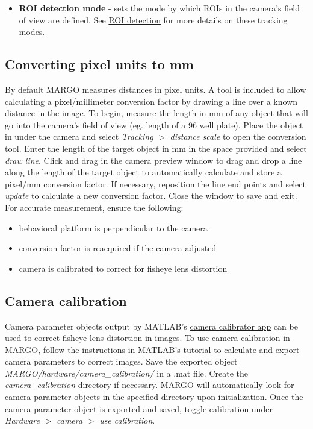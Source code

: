 \documentclass[11pt]{article}
\begin{document}
\begin{itemize}
	\item \textbf{ROI detection mode} - sets the mode by which ROIs in the camera's field of view are defined. See \hyperlink{roidetect}{ROI detection} for more details on these tracking modes.
\end{itemize}

\subsection{Converting pixel units to mm}

By default MARGO measures distances in pixel units. A tool is included to allow calculating a pixel/millimeter conversion factor by drawing a line over a known distance in the image. To begin, measure the length in mm of any object that will go into the camera's field of view (eg. length of a 96 well plate). Place the object in under the camera and select \textit{Tracking} $>$ \textit{distance scale} to open the conversion tool. Enter the length of the target object in mm in the space provided and select \textit{draw line}. Click and drag in the camera preview window to drag and drop a line along the length of the target object to automatically calculate and store a pixel/mm conversion factor. If necessary, reposition the line end points and select \textit{update} to calculate a new conversion factor. Close the window to save and exit. For accurate measurement, ensure the following:

\begin{itemize}
	\item behavioral platform is perpendicular to the camera
	\item conversion factor is reacquired if the camera adjusted
	\item camera is calibrated to correct for fisheye lens distortion 
\end{itemize}

\subsection{Camera calibration}

Camera parameter objects output by MATLAB's \href{https://www.mathworks.com/help/vision/ug/single-camera-calibrator-app.html}{camera calibrator app} can be used to correct fisheye lens distortion in images. To use camera calibration in MARGO, follow the instructions in MATLAB's tutorial to calculate and export camera parameters to correct images. Save the exported object \texttildelow\textit{MARGO/hardware/camera\_calibration/} in a .mat file. Create the \textit{camera\_calibration} directory if necessary. MARGO will automatically look for camera parameter objects in the specified directory upon initialization. Once the camera parameter object is exported and saved, toggle calibration under \textit{Hardware} $>$ \textit{camera} $>$ \textit{use calibration}.
\end{document}
